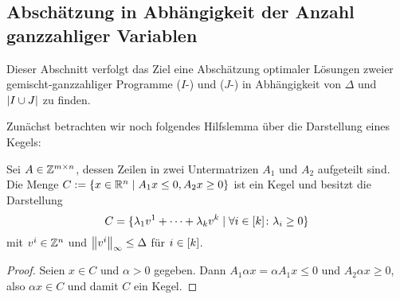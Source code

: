 \subsection{Abschätzung in Abhängigkeit der Anzahl ganzzahliger Variablen}
Dieser Abschnitt verfolgt das Ziel eine Abschätzung optimaler Lösungen zweier gemischt-ganzzahliger Programme	($I$-\MIPR) und ($J$-\MIPR) in Abhängigkeit von $\Delta$ und $\lvert I\cup J \rvert$ zu finden.

Zunächst betrachten wir noch folgendes Hilfslemma über die Darstellung eines Kegels:
\begin{lemma}\label{lem:cone}
	Sei $A\in\mathbb{Z}^{m\times n}$, dessen Zeilen in zwei Untermatrizen $A_1$ und $A_2$ aufgeteilt sind.
	Die Menge $C:=\{ x\in\mathbb{R}^n \mid A_1x\leq 0, A_2x\geq0 \}$ ist ein Kegel und besitzt die Darstellung \[ C=\{\lambda_1 v^1+\dots+\lambda_kv^k \mid \forall i\in[k] \colon\lambda_i\geq0 \}\] mit $v^i\in\mathbb{Z}^n$ und $\left\lVert v^i\right\rVert_\infty\leq\Delta$ für $i\in[k]$.
\end{lemma}
\begin{proof}
	Seien $x\in C$ und $\alpha>0$ gegeben.
	Dann $A_1 \alpha x=\alpha A_1 x\leq 0$ und $A_2\alpha x\geq0$, also $\alpha x\in C$ und damit $C$ ein Kegel.
	
\end{proof}

